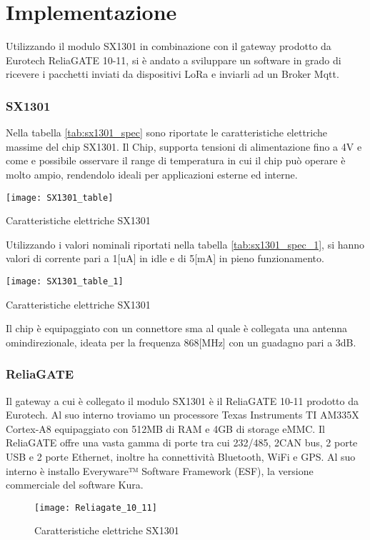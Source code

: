 \chapter{Implementazione}
Utilizzando il modulo SX1301 in combinazione con il gateway prodotto da Eurotech
ReliaGATE 10-11, si è andato a sviluppare un software in grado di ricevere i
pacchetti inviati da dispositivi LoRa e inviarli ad un Broker Mqtt.

\subsection{SX1301}
Nella tabella \ref{tab:sx1301_spec} sono riportate le caratteristiche elettriche
massime del  chip SX1301. Il Chip, supporta tensioni di
alimentazione fino a 4V e  come e possibile osservare il range di temperatura in cui il
chip può operare è molto ampio, rendendolo ideali per applicazioni esterne ed
interne. 

\begin{table}[h]
\centering 
\texttt{[image: SX1301\_table]}
\caption{Caratteristiche elettriche SX1301}
\label{tab:sx1301_spec}
\end{table}
Utilizzando i valori nominali riportati nella tabella \ref{tab:sx1301_spec_1},
si hanno valori di corrente pari a 1[uA] in idle  e di 5[mA] in pieno
funzionamento.
\begin{table}[h]
\centering 
\texttt{[image: SX1301\_table\_1]}
\caption{Caratteristiche elettriche SX1301}
\label{tab:sx1301_spec_1}
\end{table}
Il chip è equipaggiato con un connettore sma al quale è collegata una
antenna omindirezionale, ideata per la frequenza 868[MHz] con un guadagno pari a 3dB.
\subsection{ReliaGATE}
Il gateway a cui è collegato il modulo SX1301 è il ReliaGATE 10-11 prodotto da
Eurotech. Al suo interno troviamo un processore Texas Instruments TI AM335X Cortex-A8 
equipaggiato con 512MB di RAM e 4GB di storage eMMC. Il ReliaGATE offre una
vasta gamma di porte tra cui 232/485, 2CAN bus, 2 porte USB e 2 porte Ethernet,
inoltre ha connettività Bluetooth, WiFi e GPS. Al suo interno è installo
Everyware™ Software Framework (ESF), la versione commerciale del software Kura.
\begin{figure}[h]
\centering 
\texttt{[image: Reliagate\_10\_11]}
\caption{Caratteristiche elettriche SX1301}
\label{fig:ReliaGATE}
\end{figure}


